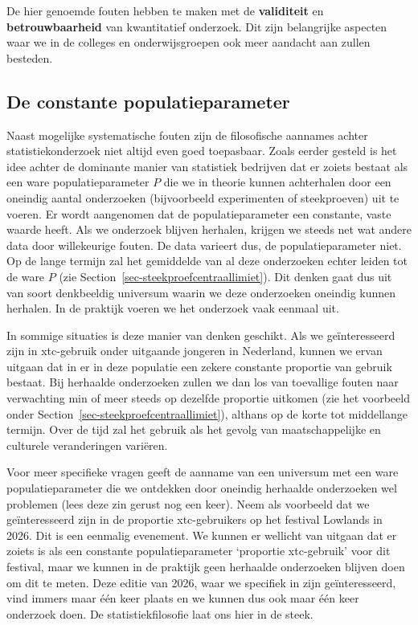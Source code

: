 \documentclass[
  letterpaper,
  DIV=11,
  numbers=noendperiod]{scrreprt}
\begin{document}
De hier genoemde fouten hebben te maken met de \textbf{validiteit} en
\textbf{betrouwbaarheid} van kwantitatief onderzoek. Dit zijn
belangrijke aspecten waar we in de colleges en onderwijsgroepen ook meer
aandacht aan zullen besteden.

\subsection{De constante
populatieparameter}\label{de-constante-populatieparameter}

Naast mogelijke systematische fouten zijn de filosofische aannames
achter statistiekonderzoek niet altijd even goed toepasbaar. Zoals
eerder gesteld is het idee achter de dominante manier van statistiek
bedrijven dat er zoiets bestaat als een ware populatieparameter \(P\)
die we in theorie kunnen achterhalen door een oneindig aantal
onderzoeken (bijvoorbeeld experimenten of steekproeven) uit te voeren.
Er wordt aangenomen dat de populatieparameter een constante, vaste
waarde heeft. Als we onderzoek blijven herhalen, krijgen we steeds net
wat andere data door willekeurige fouten. De data varieert dus, de
populatieparameter niet. Op de lange termijn zal het gemiddelde van al
deze onderzoeken echter leiden tot de ware \(P\) (zie
Section~\ref{sec-steekproefcentraallimiet}). Dit denken gaat dus uit van
soort denkbeeldig universum waarin we deze onderzoeken oneindig kunnen
herhalen. In de praktijk voeren we het onderzoek vaak eenmaal uit.

In sommige situaties is deze manier van denken geschikt. Als we
geïnteresseerd zijn in xtc-gebruik onder uitgaande jongeren in
Nederland, kunnen we ervan uitgaan dat in er in deze populatie een
zekere constante proportie van gebruik bestaat. Bij herhaalde
onderzoeken zullen we dan los van toevallige fouten naar verwachting min
of meer steeds op dezelfde proportie uitkomen (zie het voorbeeld onder
Section~\ref{sec-steekproefcentraallimiet}), althans op de korte tot
middellange termijn. Over de tijd zal het gebruik als het gevolg van
maatschappelijke en culturele veranderingen variëren.

Voor meer specifieke vragen geeft de aanname van een universum met een
ware populatieparameter die we ontdekken door oneindig herhaalde
onderzoeken wel problemen (lees deze zin gerust nog een keer). Neem als
voorbeeld dat we geïnteresseerd zijn in de proportie xtc-gebruikers op
het festival Lowlands in 2026. Dit is een eenmalig evenement. We kunnen
er wellicht van uitgaan dat er zoiets is als een constante
populatieparameter `proportie xtc-gebruik' voor dit festival, maar we
kunnen in de praktijk geen herhaalde onderzoeken blijven doen om dit te
meten. Deze editie van 2026, waar we specifiek in zijn geïnteresseerd,
vind immers maar één keer plaats en we kunnen dus ook maar één keer
onderzoek doen. De statistiekfilosofie laat ons hier in de steek.
\end{document}
